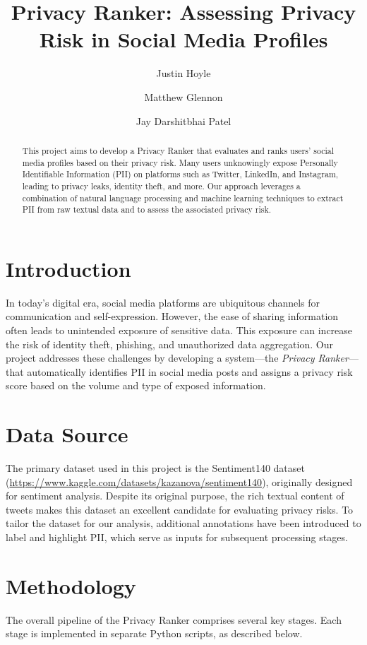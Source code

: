 \documentclass{article}
\title{Privacy Ranker: Assessing Privacy Risk in Social Media Profiles}
\author[1]{Justin Hoyle}
\author[2]{Matthew Glennon}
\author[3]{Jay Darshitbhai Patel}
\affil[1,2,3]{Virginia Commonwealth University}
\affil[1]{\texttt{hoylejb2@vcu.edu}}
\affil[2]{\texttt{mglennon@vcu.edu}}
\affil[3]{\texttt{patelj33@vcu.edu}}
\begin{document}
\maketitle

\begin{abstract}
This project aims to develop a Privacy Ranker that evaluates and ranks users’ social media profiles based on their privacy risk. Many users unknowingly expose Personally Identifiable Information (PII) on platforms such as Twitter, LinkedIn, and Instagram, leading to privacy leaks, identity theft, and more. Our approach leverages a combination of natural language processing and machine learning techniques to extract PII from raw textual data and to assess the associated privacy risk.
\end{abstract}

\section{Introduction}
In today's digital era, social media platforms are ubiquitous channels for communication and self-expression. However, the ease of sharing information often leads to unintended exposure of sensitive data. This exposure can increase the risk of identity theft, phishing, and unauthorized data aggregation. Our project addresses these challenges by developing a system—the \emph{Privacy Ranker}—that automatically identifies PII in social media posts and assigns a privacy risk score based on the volume and type of exposed information.

\section{Data Source}
The primary dataset used in this project is the Sentiment140 dataset (\url{https://www.kaggle.com/datasets/kazanova/sentiment140}), originally designed for sentiment analysis. Despite its original purpose, the rich textual content of tweets makes this dataset an excellent candidate for evaluating privacy risks. To tailor the dataset for our analysis, additional annotations have been introduced to label and highlight PII, which serve as inputs for subsequent processing stages.

\section{Methodology}
The overall pipeline of the Privacy Ranker comprises several key stages. Each stage is implemented in separate Python scripts, as described below.
\end{document}

